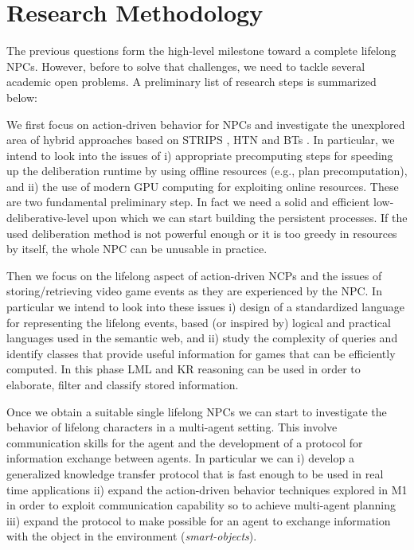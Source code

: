 \section{Research Methodology}

The previous questions form the high-level milestone toward a complete lifelong NPCs. However, before to solve that challenges, we need to tackle several academic open problems. A preliminary list of research steps is summarized below:

\begin{methodologies}
\item We first focus on action-driven behavior for NPCs and investigate the unexplored area of hybrid approaches based on STRIPS \cite{fikes1972strips}, HTN \cite{DBLP:conf/ijcai/Sacerdoti75} and BTs \cite{Isla05BehaviorTrees}. In particular, we intend to look into the issues of i) appropriate precomputing steps for speeding up the deliberation runtime by using offline resources (e.g., plan precomputation), and ii) the use of modern GPU computing for exploiting online resources. These are two fundamental preliminary step. In fact we need a solid and efficient low-deliberative-level upon which we can start building the persistent processes. If the used deliberation method is not powerful enough or it is too greedy in resources by itself, the whole NPC can be unusable in practice.
%
\item Then we focus on the lifelong aspect of action-driven NCPs and the issues of storing/retrieving video game events as they are experienced by the NPC. In particular we intend to look into these issues i) design of a standardized language for representing the lifelong events, based (or inspired by) logical and practical languages used in the semantic web, and ii) study the complexity of queries and identify classes that provide useful information for games that can be efficiently computed. In this phase LML and KR reasoning can be used in order to elaborate, filter and classify stored information.
%
%
\item Once we obtain a suitable single lifelong NPCs we can start to investigate the behavior of lifelong characters in a multi-agent setting. This involve communication skills for the agent and the development of a protocol for information exchange between agents. In particular we can i) develop a generalized knowledge transfer protocol that is fast enough to be used in real time applications ii) expand the action-driven behavior techniques explored in M1 in order to exploit communication capability so to achieve multi-agent planning iii) expand the protocol to make possible for an agent to exchange information with the object in the environment (\emph{smart-objects}).

\end{methodologies}
